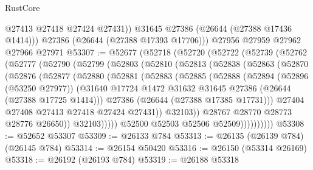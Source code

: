 \begin{lexlean}{RustCore}
\begin{coremodule}
            @27413
            @27418
            @27424
            @27431))
        @31645
        @27386
        (@26644 (@27388 @17436 @1414)))
      @27386
      (@26644 (@27388 @17393 @17706)))
    @27956
    @27959
    @27962
    @27966
    @27971
@53307 := @52677
    (@52718
      (@52720
        (@52722
          (@52739
            (@52762
              (@52777
                (@52790
                  (@52799
                    (@52803
                      (@52810
                        (@52813
                          (@52838
                            (@52863
                              (@52870
                                (@52876
                                  (@52877
                                    (@52880
                                      (@52881
                                        (@52883
                                          (@52885
                                            (@52888
                                              (@52894
                                                (@52896 (@53250 @27977))
                                                (@31640
                                                  @17724
                                                  @1472
                                                  @31632
                                                  @31645
                                                  @27386
                                                  (@26644 (@27388 @17725 @1414)))
                                                @27386
                                                (@26644 (@27388 @17385 @17731)))
                                              @27404
                                              @27408
                                              @27413
                                              @27418
                                              @27424
                                              @27431))
                                          @32103))
                                      @28767
                                      @28770
                                      @28773
                                      @28776
                                      @26650))
                                  @32103)))))
                        @52500
                        @52503
                        @52506
                        @52509))))))))))
@53308 := @52652 @53307
@53309 := @26133 @784
@53313 := @26135 (@26139 @784) (@26145 @784)
@53314 := @26154 @50420
@53316 := @26150 (@53314 @26169)
@53318 := @26192 (@26193 @784)
@53319 := @26188 @53318

\end{coremodule}
\end{lexlean}
